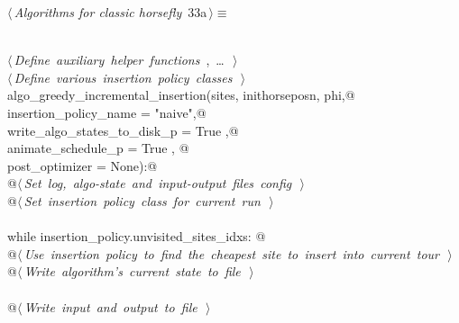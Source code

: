 \documentclass[11.5pt]{report}
\begin{document}
\begin{flushleft} \small\label{scrap25}\raggedright\small
{} $\langle\,${\itshape Algorithms for classic horsefly}\nobreak\ {\footnotesize {33a}}$\,\rangle\equiv$
\vspace{-1ex}
\begin{list}{}{} \item
\mbox{}\verb@@\\
\mbox{}\verb@@\hbox{$\langle\,${\itshape Define auxiliary helper functions}\nobreak\ {\footnotesize {}, \ldots\ }$\,\rangle$}\verb@@\\
\mbox{}\verb@@\hbox{$\langle\,${\itshape Define various insertion policy classes}\nobreak\ {\footnotesize {}}$\,\rangle$}\verb@@\\
\mbox{}\verb@def algo_greedy_incremental_insertion(sites, inithorseposn, phi,@\\
\mbox{}\verb@                                      insertion_policy_name       = "naive",@\\
\mbox{}\verb@                                      write_algo_states_to_disk_p = True   ,@\\
\mbox{}\verb@                                      animate_schedule_p          = True   , @\\
\mbox{}\verb@                                      post_optimizer              = None):@\\
\mbox{}\verb@      @\hbox{$\langle\,${\itshape Set log, algo-state and input-output files config}\nobreak\ {\footnotesize {}}$\,\rangle$}\verb@@\\
\mbox{}\verb@      @\hbox{$\langle\,${\itshape Set insertion policy class for current run}\nobreak\ {\footnotesize {}}$\,\rangle$}\verb@@\\
\mbox{}\verb@@\\
\mbox{}\verb@      while insertion_policy.unvisited_sites_idxs: @\\
\mbox{}\verb@         @\hbox{$\langle\,${\itshape Use insertion policy to find the cheapest site to insert into current tour}\nobreak\ {\footnotesize {}}$\,\rangle$}\verb@@\\
\mbox{}\verb@         @\hbox{$\langle\,${\itshape Write algorithm's current state to file}\nobreak\ {\footnotesize {}}$\,\rangle$}\verb@@\\
\mbox{}\verb@@\\
\mbox{}\verb@      @\hbox{$\langle\,${\itshape Write input and output to file}\nobreak\ {\footnotesize {}}$\,\rangle$}\verb@@\\

\end{list}
\end{flushleft}
\end{document}
